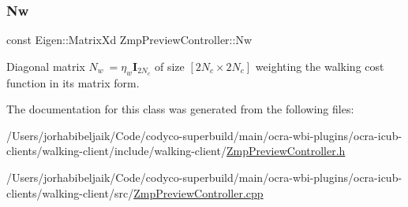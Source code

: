 \subsubsection{\texorpdfstring{Nw}{Nw}}
{\footnotesize\ttfamily const Eigen\+::\+Matrix\+Xd Zmp\+Preview\+Controller\+::\+Nw\hspace{0.3cm}{\ttfamily [private]}}

Diagonal matrix $N_w\ = \eta_w\mathbf{I}_{2N_c}$ of size $[2N_c \times 2N_c]$ weighting the walking cost function in its matrix form. 

The documentation for this class was generated from the following files\+:\begin{DoxyCompactItemize}
\item 
/\+Users/jorhabibeljaik/\+Code/codyco-\/superbuild/main/ocra-\/wbi-\/plugins/ocra-\/icub-\/clients/walking-\/client/include/walking-\/client/\hyperlink{ZmpPreviewController_8h}{Zmp\+Preview\+Controller.\+h}\item 
/\+Users/jorhabibeljaik/\+Code/codyco-\/superbuild/main/ocra-\/wbi-\/plugins/ocra-\/icub-\/clients/walking-\/client/src/\hyperlink{ZmpPreviewController_8cpp}{Zmp\+Preview\+Controller.\+cpp}\end{DoxyCompactItemize}
